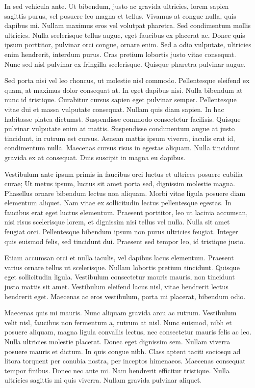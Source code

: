 In sed vehicula ante. Ut bibendum, justo ac gravida ultricies, lorem sapien
sagittis purus, vel posuere leo magna et tellus. Vivamus at congue nulla, quis
dapibus mi. Nullam maximus eros vel volutpat pharetra. Sed condimentum mollis
ultricies. Nulla scelerisque tellus augue, eget faucibus ex placerat ac. Donec
quis ipsum porttitor, pulvinar orci congue, ornare enim. Sed a odio vulputate,
ultricies enim hendrerit, interdum purus. Cras pretium lobortis justo vitae
consequat. Nunc sed nisl pulvinar ex fringilla scelerisque. Quisque pharetra
pulvinar augue.

Sed porta nisi vel leo rhoncus, ut molestie nisl commodo. Pellentesque eleifend
ex quam, at maximus dolor consequat at. In eget dapibus nisi. Nulla bibendum at
nunc id tristique. Curabitur cursus sapien eget pulvinar semper. Pellentesque
vitae dui et massa vulputate consequat. Nullam quis diam sapien. In hac
habitasse platea dictumst. Suspendisse commodo consectetur facilisis. Quisque
pulvinar vulputate enim at mattis. Suspendisse condimentum augue at justo
tincidunt, in rutrum est cursus. Aenean mattis ipsum viverra, iaculis erat id,
condimentum nulla. Maecenas cursus risus in egestas aliquam. Nulla tincidunt
gravida ex at consequat. Duis suscipit in magna eu dapibus.

Vestibulum ante ipsum primis in faucibus orci luctus et ultrices posuere
cubilia curae; Ut metus ipsum, luctus sit amet porta sed, dignissim molestie
magna. Phasellus ornare bibendum lectus non aliquam. Morbi vitae ligula posuere
diam elementum aliquet. Nam vitae ex sollicitudin lectus pellentesque egestas.
In faucibus erat eget luctus elementum. Praesent porttitor, leo ut lacinia
accumsan, nisi risus scelerisque lorem, et dignissim nisi tellus vel nulla.
Nulla sit amet feugiat orci. Pellentesque bibendum ipsum non purus ultricies
feugiat. Integer quis euismod felis, sed tincidunt dui. Praesent sed tempor
leo, id tristique justo.

Etiam accumsan orci et nulla iaculis, vel dapibus lacus elementum. Praesent
varius ornare tellus ut scelerisque. Nullam lobortis pretium tincidunt. Quisque
eget sollicitudin ligula. Vestibulum consectetur mauris mauris, non tincidunt
justo mattis sit amet. Vestibulum eleifend lacus nisl, vitae hendrerit lectus
hendrerit eget. Maecenas ac eros vestibulum, porta mi placerat, bibendum odio.

Maecenas quis mi mauris. Nunc aliquam gravida arcu ac rutrum. Vestibulum velit
nisl, faucibus non fermentum a, rutrum at nisl. Nunc euismod, nibh et posuere
aliquam, magna ligula convallis lectus, nec consectetur mauris felis ac leo.
Nulla ultricies molestie placerat. Donec eget dignissim sem. Nullam viverra
posuere mauris et dictum. In quis congue nibh. Class aptent taciti sociosqu ad
litora torquent per conubia nostra, per inceptos himenaeos. Maecenas consequat
tempor finibus. Donec nec ante mi. Nam hendrerit efficitur tristique. Nulla
ultricies sagittis mi quis viverra. Nullam gravida pulvinar aliquet.

